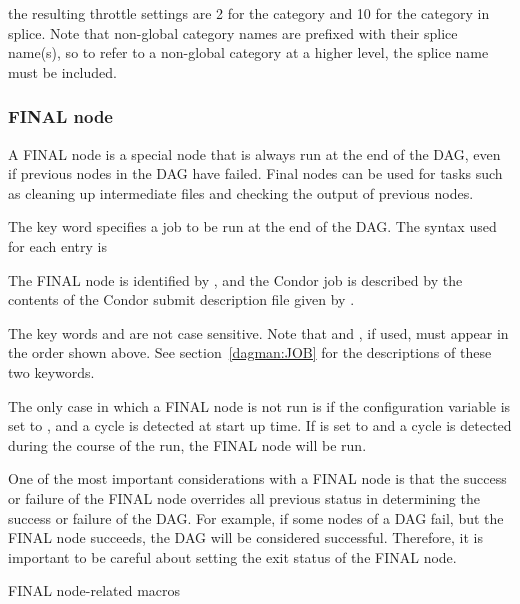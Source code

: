 the resulting throttle settings are 2 for the  category
and 10 for the  category in splice.
Note that non-global category names are
prefixed with their splice name(s), so to refer to a non-global category 
at a higher level, the splice name must be included.


\subsubsection{\label{sec:DAGFinalNode}FINAL node}

A FINAL node is a special node that is always run at the end of the DAG,
even if previous nodes in the DAG have failed.  Final nodes can be used
for tasks such as cleaning up intermediate files and checking the output
of previous nodes.

The  key word specifies a job to be run at the end of
the DAG.  The syntax used for each  entry is

  
 

The FINAL node is identified by , and the Condor job
is described by the contents of the Condor submit description file
given by .

The key words  and  are not case sensitive.
Note that  and , if used, must appear
in the order shown above.
See section~\ref{dagman:JOB} for the descriptions of these two keywords.

The only case in which a FINAL node is not run
is if the configuration variable  
is set to ,
and a cycle is detected at start up time.
If  is set to  and
a cycle is detected during the course of the run, 
the FINAL node will be run.

One of the most important considerations with a FINAL node is that the
success or failure of the FINAL node overrides all previous status
in determining the success or failure of the DAG.
For example, if some nodes of a DAG fail,
but the FINAL node succeeds, the DAG will be considered successful.
Therefore, it is important
to be careful about setting the exit status of the FINAL node.

\begin{description}
\item[FINAL node-related macros]
\end{description}

